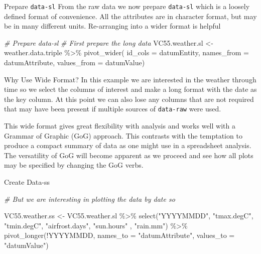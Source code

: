 \documentclass[
  ignorenonframetext,
]{beamer}
\newenvironment{Shaded}{\begin{snugshade}}{\end{snugshade}}
\newcommand{\AttributeTok}[1]{\textcolor[rgb]{0.77,0.63,0.00}{#1}}
\newcommand{\CommentTok}[1]{\textcolor[rgb]{0.56,0.35,0.01}{\textit{#1}}}
\newcommand{\FunctionTok}[1]{\textcolor[rgb]{0.00,0.00,0.00}{#1}}
\newcommand{\NormalTok}[1]{#1}
\newcommand{\OtherTok}[1]{\textcolor[rgb]{0.56,0.35,0.01}{#1}}
\newcommand{\SpecialCharTok}[1]{\textcolor[rgb]{0.00,0.00,0.00}{#1}}
\newcommand{\StringTok}[1]{\textcolor[rgb]{0.31,0.60,0.02}{#1}}
\begin{document}
\begin{frame}[fragile]{Prepare \texttt{data-sl}}
\protect\hypertarget{prepare-data-sl}{}
From the raw data we now prepare \texttt{data-sl} which is a loosely
defined format of convenience. All the attributes are in character
format, but may be in many different units. Re-arranging into a wider
format is helpful

\begin{Shaded}
\begin{Highlighting}[]
\CommentTok{\# Prepare data{-}sl}
\CommentTok{\# First prepare the long data}
\NormalTok{VC55.weather.sl }\OtherTok{\textless{}{-}}\NormalTok{ weather.data.triple }\SpecialCharTok{\%\textgreater{}\%}
                  \FunctionTok{pivot\_wider}\NormalTok{(}
  \AttributeTok{id\_cols =}\NormalTok{ datumEntity,}
  \AttributeTok{names\_from =}\NormalTok{ datumAttribute,}
  \AttributeTok{values\_from =}\NormalTok{ datumValue)}
\end{Highlighting}
\end{Shaded}
\end{frame}

\begin{frame}[fragile]{Why Use Wide Format?}
\protect\hypertarget{why-use-wide-format}{}
In this example we are interested in the weather through time so we
select the columns of interest and make a long format with the date as
the key column. At this point we can also lose any columns that are not
required that may have been present if multiple sources of
\texttt{data-raw} were used.

This wide format gives great flexibility with analysis and works well
with a Grammar of Graphic (GoG) approach. This contrasts with the
temptation to produce a compact summary of data as one might use in a
spreadsheet analysis. The versatility of GoG will become apparent as we
proceed and see how all plots may be specified by changing the GoG
verbs.
\end{frame}

\begin{frame}[fragile]{Create Data-ss}
\protect\hypertarget{create-data-ss}{}
\begin{Shaded}
\begin{Highlighting}[]
\CommentTok{\# But we are interesting in plotting the data by date so}

\NormalTok{  VC55.weather.ss }\OtherTok{\textless{}{-}}\NormalTok{ VC55.weather.sl }\SpecialCharTok{\%\textgreater{}\%} 
    \FunctionTok{select}\NormalTok{(}\StringTok{"YYYYMMDD"}\NormalTok{, }
           \StringTok{"tmax.degC"}\NormalTok{,}
           \StringTok{"tmin.degC"}\NormalTok{,}
           \StringTok{"airfrost.days"}\NormalTok{, }
           \StringTok{"sun.hours"}\NormalTok{ ,}
           \StringTok{"rain.mm"}\NormalTok{)     }\SpecialCharTok{\%\textgreater{}\%}
            \FunctionTok{pivot\_longer}\NormalTok{(}\SpecialCharTok{!}\NormalTok{YYYYMMDD,}
                  \AttributeTok{names\_to =} \StringTok{"datumAttribute"}\NormalTok{, }
                  \AttributeTok{values\_to =} \StringTok{"datumValue"}\NormalTok{) }
\end{Highlighting}
\end{Shaded}
\end{frame}
\end{document}
